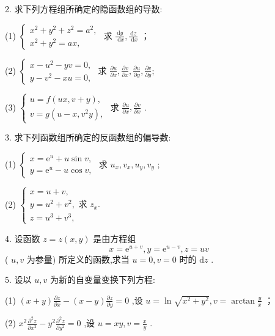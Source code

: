 2. 求下列方程组所确定的隐函数组的导数:

(1) \(\left\{  \begin{array}{l} {x}^{2} + {y}^{2} + {z}^{2} = {a}^{2}, \\  {x}^{2} + {y}^{2} = {ax}, \end{array}\right.\) 求 \(\frac{\mathrm{d}y}{\mathrm{\;d}x},\frac{\mathrm{d}z}{\mathrm{\;d}x}\) ；

(2) \(\left\{  \begin{array}{l} x - {u}^{2} - {yv} = 0, \\  y - {v}^{2} - {xu} = 0, \end{array}\right.\) 求 \(\frac{\partial u}{\partial x},\frac{\partial v}{\partial x},\frac{\partial u}{\partial y},\frac{\partial v}{\partial y};\)

(3) \(\left\{  \begin{array}{l} u = f\left( {{ux},v + y}\right) , \\  v = g\left( {u - x,{v}^{2}y}\right) , \end{array}\right.\) 求 \(\frac{\partial u}{\partial x},\frac{\partial v}{\partial x}\) .

3. 求下列函数组所确定的反函数组的偏导数:

(1) \(\left\{  \begin{array}{l} x = {\mathrm{e}}^{u} + u\sin v, \\  y = {\mathrm{e}}^{u} - u\cos v, \end{array}\right.\) 求 \({u}_{x},{v}_{x},{u}_{y},{v}_{y}\) ;

(2) \(\left\{  \begin{array}{l} x = u + v, \\  y = {u}^{2} + {v}^{2},\text{ 求 }{z}_{x}. \\  z = {u}^{3} + {v}^{3}, \end{array}\right.\)

4. 设函数 \(z = z\left( {x,y}\right)\) 是由方程组
\[
x = {\mathrm{e}}^{u + v},y = {\mathrm{e}}^{u - v},z = {uv}
\]
( \(u,v\) 为参量) 所定义的函数,求当 \(u = 0,v = 0\) 时的 \(\mathrm{d}z\) .

5. 设以 \(u,v\) 为新的自变量变换下列方程:

(1) \(\left( {x + y}\right) \frac{\partial z}{\partial x} - \left( {x - y}\right) \frac{\partial z}{\partial y} = 0\) ,设 \(u = \ln \sqrt{{x}^{2} + {y}^{2}},v = \arctan \frac{y}{x}\) ；

(2) \({x}^{2}\frac{{\partial }^{2}z}{\partial {x}^{2}} - {y}^{2}\frac{{\partial }^{2}z}{\partial {y}^{2}} = 0\) ,设 \(u = {xy},v = \frac{x}{y}\) .

